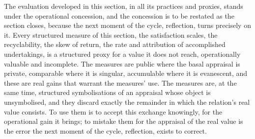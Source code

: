 The evaluation developed in this section, in all its practices and proxies, stands under the operational concession, and the concession is to be restated as the section closes, because the next moment of the cycle, reflection, turns precisely on it. Every structured measure of this section, the satisfaction scales, the recyclability, the skew of return, the rate and attribution of accomplished undertakings, is a structured proxy for a value it does not reach, operationally valuable and incomplete. The measures are public where the basal appraisal is private, comparable where it is singular, accumulable where it is evanescent, and these are real gains that warrant the measures' use. The measures are, at the same time, structured symbolisations of an appraisal whose object is unsymbolised, and they discard exactly the remainder in which the relation's real value consists. To use them is to accept this exchange knowingly, for the operational gain it brings; to mistake them for the appraisal of the real value is the error the next moment of the cycle, reflection, exists to correct.
